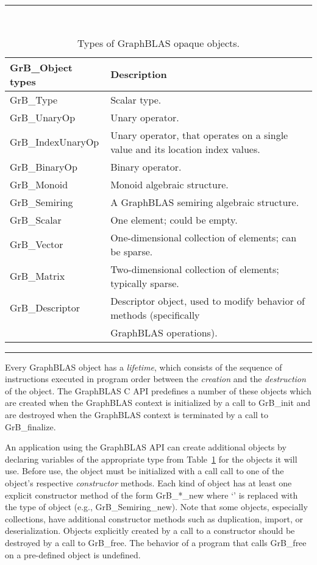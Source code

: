 \begin{table}
\hrule
\begin{center}
\caption{Types of GraphBLAS opaque objects.}
\label{Tab:ObjTypes}
~\\
\begin{tabular}{l|l}
{\sf GrB\_Object types} & Description \\
\hline
{\sf GrB\_Type}           & Scalar type.     \\ \hline
{\sf GrB\_UnaryOp}        & Unary operator.     \\
{\sf GrB\_IndexUnaryOp}   & Unary operator, that operates on a single value and its location index values.     \\
{\sf GrB\_BinaryOp}       & Binary operator.     \\
{\sf GrB\_Monoid}         & Monoid algebraic structure.     \\
{\sf GrB\_Semiring}       & A GraphBLAS semiring algebraic structure. \\ \hline
{\sf GrB\_Scalar}         & One element; could be empty. \\ 
{\sf GrB\_Vector}         & One-dimensional collection of elements; can be sparse.     \\
{\sf GrB\_Matrix}         & Two-dimensional collection of elements; typically sparse.    \\ \hline
{\sf GrB\_Descriptor}     & Descriptor object, used to modify behavior of methods (specifically \\
                          & GraphBLAS operations).     \\
\end{tabular}
\end{center}
\hrule
\end{table}

Every GraphBLAS object has a \emph{lifetime}, which consists of
the sequence of instructions executed in program order between the
\emph{creation} and the \emph{destruction} of the object.  The GraphBLAS C
API predefines a number of these objects which are created
when the GraphBLAS context is initialized by a call to {\sf GrB\_init}
and are destroyed when the GraphBLAS context is terminated by a call to
{\sf GrB\_finalize}.

An application using the GraphBLAS API can create additional objects by
declaring variables of the appropriate type from Table~\ref{Tab:ObjTypes} for 
the objects it will use.  Before use, the object must be initialized 
with a call call to one of the object's respective \emph{constructor} methods.  
Each kind of object has at least one explicit constructor method of the form 
{\sf GrB\_*\_new} where `{\sf *}' is replaced with the type of object (e.g., 
{\sf GrB\_Semiring\_new}). Note that some objects, especially collections, 
have additional constructor methods such as duplication, import, or 
deserialization.  Objects explicitly created by a call to a constructor 
should be destroyed by a call to {\sf GrB\_free}. The behavior of a program
that calls {\sf GrB\_free} on a pre-defined object is undefined.

